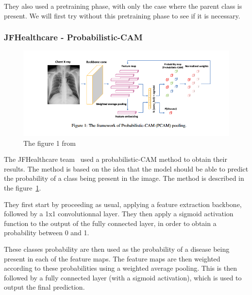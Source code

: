 \documentclass[11pt]{article}
\begin{document}
            They also used a pretraining phase, with only the case where the parent class is present. We will first try without this pretraining phase to see if it is necessary.



        \subsubsection{JFHealthcare - Probabilistic-CAM~\cite{jfhealthcare}}

            \begin{figure}[H]

                 \centering
                 \includegraphics[width=0.8 \textwidth]{plots/jfhealthcare}
                 \caption{The figure 1 from~\cite{jfhealthcare}}
                 \label{fig:jfhealthcare_probabilistic_cam}

            \end{figure}

            The JFHealthcare team~\cite{jfhealthcare} used a probabilistic-CAM method to obtain their results.
            The method is based on the idea that the model should be able to predict the probability of a class being
            present in the image. The method is described in the figure~\ref{fig:jfhealthcare_probabilistic_cam}.

            They first start by proceeding as usual, applying a feature extraction backbone, followed by a 1x1 convolutionnal layer.
            They then apply a sigmoid activation function to the output of the fully connected layer, in order to obtain a probability between 0 and 1.

            These classes probability are then used as the probability of a disease being present in each of the feature maps. The feature maps are then
            weighted according to these probabilities using a weighted average pooling. This is then followed by a fully connected layer (with a sigmoid activation), which is used to output
            the final prediction.
\end{document}
